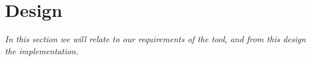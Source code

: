 \section{Design}

\textit{In this section we will relate to our requirements of the tool, and from this design the implementation. }